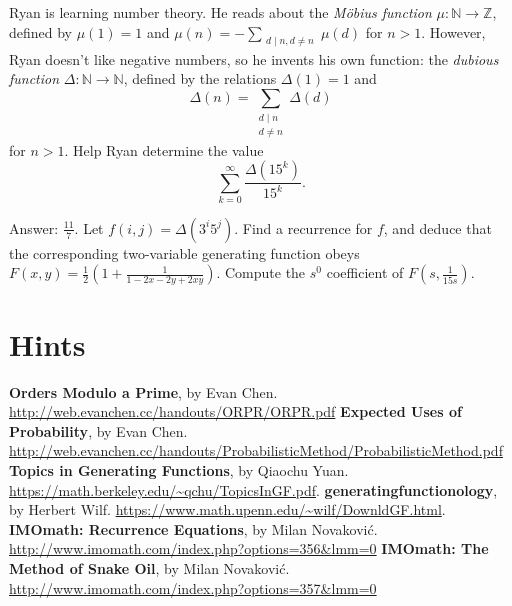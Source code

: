 \documentclass[11pt]{scrartcl}
\begin{document}
\begin{problem}
  Ryan is learning number theory.
  He reads about the \emph{M\"obius function} $\mu : \mathbb N \to \mathbb Z$,
  defined by $\mu(1)=1$ and
  $\mu(n) = -\sum_{\substack{d\mid n, d \neq n}} \mu(d)$
  for $n>1$.
  However, Ryan doesn't like negative numbers, so he invents his own function:
  the \emph{dubious function} $\Delta : \mathbb N \to \mathbb N$,
  defined by the relations $\Delta(1)=1$ and
  \[ \Delta(n) = \sum_{\substack{d\mid n \\ d \neq n}} \Delta(d) \]
  for $n > 1$. Help Ryan determine the value
  \[ \sum_{k=0}^{\infty} \frac{\Delta(15^k)}{15^k}.  \]
  \begin{hint}
    Answer: $\frac{11}{7}$.
    Let $f(i,j) = \Delta(3^i5^j)$.
    Find a recurrence for $f$, and deduce that the
    corresponding two-variable generating function obeys
    $F(x,y)=\frac{1}{2}\left(1+\frac{1}{1-2x-2y+2xy}\right)$.
    Compute the $s^0$ coefficient of $F(s, \frac{1}{15s})$.
  \end{hint}
\end{problem}

\section{Hints}
\makehints

\begin{thebibliography}{9}
   \textbf{Orders Modulo a Prime}, by Evan Chen.
    \url{http://web.evanchen.cc/handouts/ORPR/ORPR.pdf}
   \textbf{Expected Uses of Probability}, by Evan Chen.
    \url{http://web.evanchen.cc/handouts/ProbabilisticMethod/ProbabilisticMethod.pdf}
   \textbf{Topics in Generating Functions}, by Qiaochu Yuan.
    \url{https://math.berkeley.edu/~qchu/TopicsInGF.pdf}.
   \textbf{generatingfunctionology}, by Herbert Wilf.
    \url{https://www.math.upenn.edu/~wilf/DownldGF.html}.
   \textbf{IMOmath: Recurrence Equations}, by Milan Novakovi\'c.
    \url{http://www.imomath.com/index.php?options=356&lmm=0}
   \textbf{IMOmath: The Method of Snake Oil}, by Milan Novakovi\'c.
    \url{http://www.imomath.com/index.php?options=357&lmm=0}
\end{thebibliography}
\end{document}
